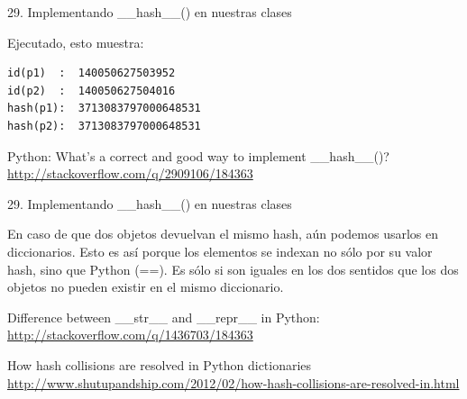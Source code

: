 \documentclass[14pt]{beamer}
\begin{document}
\begin{frame}[fragile]
  {29. \normalsize Implementando \_\_hash\_\_() en nuestras clases}
  \small
  \begin{exampleblock}
    {Ejecutado, esto muestra:}
    \begin{lstlisting}
id(p1)  :  140050627503952
id(p2)  :  140050627504016
hash(p1):  3713083797000648531
hash(p2):  3713083797000648531
    \end{lstlisting}
  \end{exampleblock}

  \footnotesize
  \begin{block}
    {\centering Python: What's a correct and good way to implement \_\_hash\_\_()?}
    \centering \url{http://stackoverflow.com/q/2909106/184363}
  \end{block}
\end{frame}

\begin{frame}
  {29. \normalsize Implementando \_\_hash\_\_() en nuestras clases}
  \small
  \begin{alertblock}{}
    \centering
    En caso de que dos objetos devuelvan el mismo hash, aún podemos
    usarlos en diccionarios. Esto es así porque los elementos se
    indexan no sólo por su valor hash, sino que Python
     (==). Es sólo si
    son iguales en los dos sentidos que los dos objetos no pueden
    existir en el mismo diccionario.
  \end{alertblock}

  \footnotesize
  \begin{block}
    {\centering Difference between \_\_str\_\_ and \_\_repr\_\_ in Python:}
    \centering \url{http://stackoverflow.com/q/1436703/184363}
  \end{block}

  \begin{block}
    {\centering How hash collisions are resolved in Python dictionaries}
    \centering \url{http://www.shutupandship.com/2012/02/how-hash-collisions-are-resolved-in.html}
  \end{block}
\end{frame}
\end{document}
